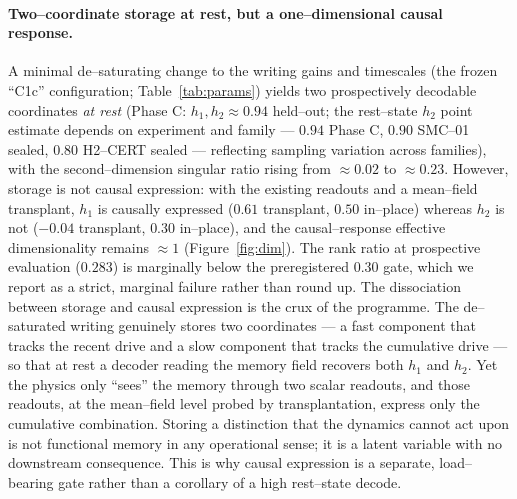 \documentclass[11pt]{article}
\begin{document}
\paragraph{Two--coordinate storage at rest, but a one--dimensional causal response.} A minimal de--saturating change
to the writing gains and timescales (the frozen ``C1c'' configuration; Table~\ref{tab:params}) yields two prospectively decodable coordinates \emph{at rest} (Phase C: $h_1,h_2\approx0.94$ held--out; the rest--state $h_2$ point estimate depends on experiment and family --- $0.94$ Phase C, $0.90$ SMC--01 sealed, $0.80$ H2--CERT sealed --- reflecting sampling variation across families), with the second--dimension
singular ratio rising from $\approx0.02$ to $\approx0.23$. However, storage is not causal expression: with the
existing readouts and a mean--field transplant, $h_1$ is causally expressed ($0.61$ transplant, $0.50$ in--place)
whereas $h_2$ is not ($-0.04$ transplant, $0.30$ in--place), and the causal--response effective dimensionality
remains $\approx1$ (Figure~\ref{fig:dim}). The rank ratio at prospective evaluation ($0.283$) is marginally below the
preregistered $0.30$ gate, which we report as a strict, marginal failure rather than round up. The dissociation between storage and causal expression is the crux of the programme. The de--saturated writing genuinely stores two coordinates --- a fast component that tracks the recent drive and a slow component that tracks the cumulative drive --- so that at rest a decoder reading the memory field recovers both $h_1$ and $h_2$. Yet the physics only ``sees'' the memory through two scalar readouts, and those readouts, at the mean--field level probed by transplantation, express only the cumulative combination. Storing a distinction that the dynamics cannot act upon is not functional memory in any operational sense; it is a latent variable with no downstream consequence. This is why causal expression is a separate, load--bearing gate rather than a corollary of a high rest--state decode.
\end{document}
